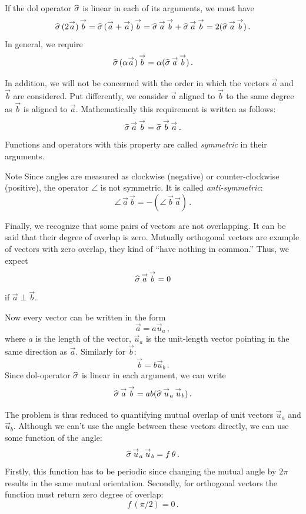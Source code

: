 If the dol operator $\widehat{\sigma}$ is linear in each of its arguments, we must
have
\[
\widehat{\sigma}\,(2\overset{\rightarrow}{a})\,\overset{\rightarrow}{b} = \widehat{\sigma}\,(\overset{\rightarrow}{a}+\overset{\rightarrow}{a})\,\overset{\rightarrow}{b} =
\widehat{\sigma}\,\overset{\rightarrow}{a}\,\overset{\rightarrow}{b} + \widehat{\sigma}\,\overset{\rightarrow}{a}\,\overset{\rightarrow}{b} = 2
(\widehat{\sigma}\,\overset{\rightarrow}{a}\,\overset{\rightarrow}{b})\,.
\]
In general, we require
\[
\widehat{\sigma}\,(\alpha\overset{\rightarrow}{a})\,\overset{\rightarrow}{b} = \alpha (\widehat{\sigma}\,\overset{\rightarrow}{a}\,\overset{\rightarrow}{b})\,.
\]

In addition, we will not be concerned with the order in which the
vectors $\vec{a}$ and $\vec{b}$ are considered. Put differently, we
consider $\vec{a}$ aligned to $\vec{b}$ to the same degree as
$\vec{b}$ is aligned to $\vec{a}$. Mathematically this requirement is
written as follows:
\[
\widehat{\sigma}\,\overset{\rightarrow}{a}\,\overset{\rightarrow}{b} = \widehat{\sigma}\,\overset{\rightarrow}{b}\,\overset{\rightarrow}{a}\,.
\]
Functions and operators with this property are called
\emph{symmetric}
in their arguments.

\begin{mybio}{Note}
Since angles are measured as clockwise (negative) or
counter-clockwise (positive), the
operator $\angle$ is not symmetric. It is called
\emph{anti-symmetric}:
\[
\angle\, \vec{a} \, \vec{b} = -(\angle\, \vec{b} \, \vec{a})\,.
\]
\end{mybio}

Finally, we recognize that some pairs of vectors are not overlapping. It
can be said that their degree of overlap is zero. Mutually
orthogonal vectors are example of vectors with zero overlap, they kind
of ``have nothing in common.'' Thus, we expect
\[
\widehat{\sigma}\,\overset{\rightarrow}{a}\,\overset{\rightarrow}{b} = 0
\]
if $\vec{a}\perp\vec{b}$.

Now every vector can be written in the form
\[
\vec{a} = a\vec{u}_a\,,
\]
where $a$ is the length of the vector, $\vec{u}_a$ is the unit-length
vector pointing in the same direction as $\vec{a}$. Similarly for
$\vec{b}$:
\[
\vec{b} = b\vec{u}_b\,.
\]
Since dol-operator $\widehat{\sigma}$ is linear in each argument, we can write
\[
\widehat{\sigma}\,\overset{\rightarrow}{a}\,\overset{\rightarrow}{b} = ab (\widehat{\sigma}\,\overset{\rightarrow}{u}_a\,\overset{\rightarrow}{u}_b)\,.
\]

The problem is thus reduced to quantifying mutual overlap of unit
vectors $\vec{u}_a$ and $\vec{u}_b$. Although we can't use the angle
between these vectors directly, we can use some function of the angle:
\[
\widehat{\sigma}\,\overset{\rightarrow}{u}_a\,\overset{\rightarrow}{u}_b = f\,\theta\,.
\]
Firstly, this function has to be periodic since changing the mutual angle by
$2\pi$ results in the same mutual orientation. Secondly, for
orthogonal vectors the function must return zero degree of overlap:
\[
f\, (\pi/2) = 0\,.
\]

